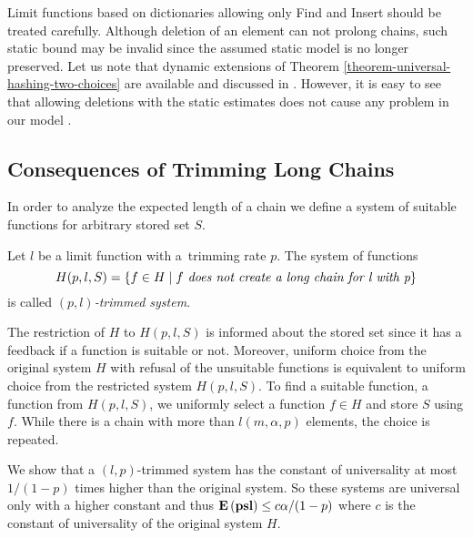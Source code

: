 Limit functions based on dictionaries allowing only Find and Insert should be treated carefully. Although deletion of an element can not prolong chains, such static bound may be invalid since the assumed static model is no longer preserved. Let us note that dynamic extensions of Theorem \ref{theorem-universal-hashing-two-choices} are available and discussed in \cite{DBLP:journals/jacm/Vocking03}. However, it is easy to see that allowing deletions with the static estimates does not cause any problem in our model .

\subsection{Consequences of Trimming Long Chains}
In order to analyze the expected length of a chain we define a system of suitable functions for arbitrary stored set $S$.
\begin{definition}
\label{definition-trimmed-system}
Let $l$ be a limit function with a~trimming rate $p$. The system of functions \[ H(p, l, S) = \{ f \in H \mid f \textit{ does not create a long chain for l with p} \} \] is called \emph{$(p, l)$-trimmed system}.
\end{definition}

The restriction of $H$ to $H(p, l, S)$ is informed about the stored set since it has a feedback if a function is suitable or not. Moreover, uniform choice from the original system $H$ with refusal of the unsuitable functions is equivalent to uniform choice from the restricted system $H(p, l, S)$. To find a suitable function, a function from $H(p, l, S)$, we uniformly select a function $f \in H$ and store $S$ using $f$. While there is a chain with more than $l(m, \alpha, p)$ elements, the choice is repeated.

We show that a $(l, p)$-trimmed system has the constant of universality at most $1 / (1 - p)$ times higher than the original system. So these systems are universal only with a higher constant and thus $\mathbf{E}\left(\mathbf{psl}\right) \leq c\alpha/(1-p)$ where $c$ is the constant of universality of the original system $H$.

